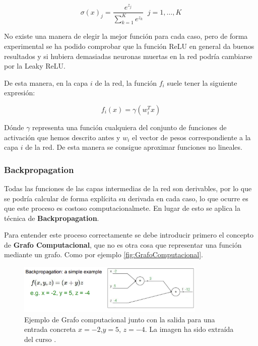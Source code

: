 \begin{itemize}
                \begin{equation}
                    \sigma(x)_j= \frac{e^{z_j}}{\sum_{k=1}^{K}e^{z_k}} \; \; j=1, \ldots, K
                \end{equation}
            \end{itemize}

            \noindent No existe una manera de elegir la mejor función para cada caso, pero de forma experimental se ha podido comprobar que la función ReLU en general da buenos resultados y si hubiera demasiadas neuronas muertas en la red podría cambiarse por la Leaky ReLU.

            \medskip

            \noindent De esta manera, en la capa $i$ de la red, la función $f_i$ suele tener la siguiente expresión: 

            \begin{equation}
                f_i(x)=\gamma(w_i^T x)
            \end{equation}

            \noindent Dónde $\gamma$ representa una función cualquiera del conjunto de funciones de activación que hemos descrito antes y $w_i$ el vector de pesos correspondiente a la capa $i$ de la red. De esta manera se consigue aproximar funciones no lineales.
        
        \subsubsection{Backpropagation}
            Todas las funciones de las capas intermedias de la red son derivables, por lo que se podría calcular de forma explícita su derivada en cada caso, lo que ocurre es que este proceso es costoso computacionalmete. En lugar de esto se aplica la técnica de \textbf{Backpropagation}.

            \medskip

            \noindent Para entender este proceso correctamente se debe introducir primero el concepto de \textbf{Grafo Computacional}, que no es otra cosa que representar una función mediante un grafo. Como por ejemplo \autoref{fig:GrafoComputacional}.

            \begin{figure}[!h]
                \centering
                \includegraphics[width=0.8\textwidth]{img/GrafoComputacional.png}
                \caption{Ejemplo de Grafo computacional junto con la salida para una entrada concreta $x=-2$,$y=5$, $z=-4$. La imagen ha sido extraída del curso \cite{StanfordCourse}.}
                \label{fig:GrafoComputacional}
            \end{figure}

